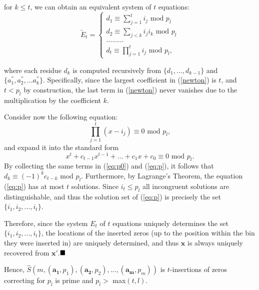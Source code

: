 for $k \leq t$, we can obtain an equivalent system of $t$
equations:
\begin{equation}
\widetilde{E}_t=\left\{
\begin{array}{ll}
d_1 \equiv \sum_{j=1}^t i_j \text{ mod }p_l\\
d_2 \equiv \sum_{j<k} i_j i_k\text{ mod }p_l\\
\dots \dots \dots \\
d_t \equiv \prod_{j=1}^t i_j \text{ mod }p_l,
\end{array} \right.
\end{equation}

where each residue $d_k$ is computed recursively from
$\{d_1,...,d_{k-1}\}$ and $\{a_1^{''},a_2^{''},...a_k^{''}\}$.
Specifically, since the largest coefficient in (\ref{newton}) is
$t$, and $t<p_l$ by construction, the last term in (\ref{newton})
never vanishes due to the multiplication by the coefficient $k$.

Consider now the following equation:
\begin{equation}\label{eq:p0} \prod_{j=1}^t(x-i_j)\equiv 0 \text{ mod } p_l,
\end{equation}
and expand it into the standard form
\begin{equation}\label{eq:p}
x^t+c_{t-1}x^{t-1}+...+c_1x+c_0 \equiv 0 \text{ mod } p_l.
\end{equation}
By collecting the same terms in (\ref{eq:p0}) and (\ref{eq:p}), it
follows that $d_k \equiv (-1)^kc_{t-k} \text{ mod } p_l$.
Furthermore, by Lagrange's Theorem, the equation (\ref{eq:p}) has
at most $t$ solutions. Since $i_t \leq p_l$ all incongruent
solutions are distinguishable, and thus the solution set of
(\ref{eq:p}) is precisely the set $\{i_1,i_2,...,i_t\}$.

Therefore, since the system $E_t$ of $t$ equations uniquely
determines the set $\{i_1,i_2,...,i_t\}$, the locations of the
inserted zeros (up to the position within the bin they were
inserted in) are uniquely determined, and thus $\mathbf{x}$ is
always uniquely recovered from $\mathbf{x'}$.$\hfill\blacksquare$

Hence,
$\hat{S}\left(m,(\mathbf{a_1},p_1),(\mathbf{a_2},p_2),...,(\mathbf{a_m},p_m)\right)$
is $t$-insertions of zeros correcting for $p_l$ is prime and $p_l
>$ max$(t,l)$.

